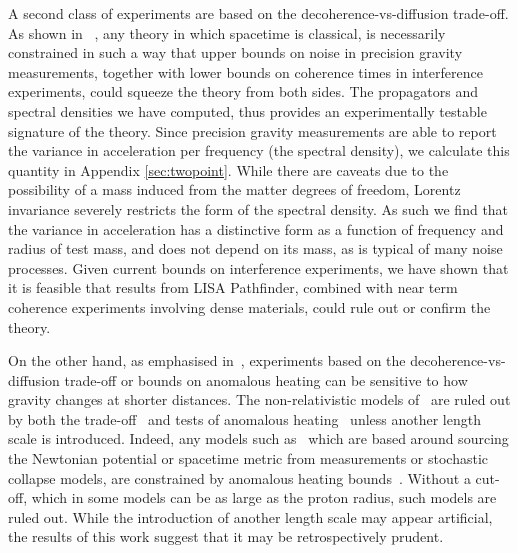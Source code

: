 \documentclass[aps,preprintnumbers,superscriptaddress,longbibliography]{revtex4-1}
\begin{document}
A second class of experiments are based on the decoherence-vs-diffusion trade-off\cite{diosi1995quantum,oppenheim2022gravitationally}. As shown in ~\cite{oppenheim2022gravitationally}, any theory in which spacetime is classical, is necessarily constrained in such a way that upper bounds on noise in precision gravity measurements, together with lower bounds on coherence times in interference experiments, could squeeze the theory from both sides. 
The propagators and spectral densities we have computed,  thus provides an experimentally testable signature of the theory. Since precision gravity measurements are able to report the variance in acceleration per frequency (the spectral density), we calculate this quantity in Appendix \ref{sec:twopoint}. While there are caveats due to the possibility of a mass induced from the matter degrees of freedom, Lorentz invariance severely restricts the form of the spectral density. As such we find that the variance in acceleration has a distinctive form as a function of frequency and radius of test mass, and does not depend on its mass, as is typical of many noise processes.  Given current bounds on interference experiments, we have shown that it is feasible that results from LISA Pathfinder, combined with near term coherence experiments involving dense materials, could rule out or confirm the theory. 



On the other hand, as emphasised in~\cite{tilloy2017principle, oppenheim2018post,oppenheim2022gravitationally}, experiments based on the decoherence-vs-diffusion trade-off or bounds on anomalous heating can be sensitive to how gravity changes at shorter distances. The non-relativistic models of~\cite{tilloy2016sourcing,tilloy2017principle} are ruled out by both the trade-off~\cite{oppenheim2022gravitationally} and tests of anomalous heating~\cite{tilloy2017principle} unless another length scale is introduced. 
 Indeed, any models such as~\cite{kafri2014classical,tilloy2016sourcing} which are based around sourcing the Newtonian potential or spacetime metric from measurements or stochastic collapse models, are constrained by anomalous heating bounds~\cite{bps,ballentine1991failure,gallis1991comparison,shimony1990desiderata,tilloy2017principle,helou2017lisa,donadi2021underground}. Without a cut-off, which in some models can be as large as the proton radius, such models are ruled out. 
 While the introduction of another length scale may appear artificial, the results of this work suggest that it may be retrospectively prudent. 
 
\end{document}
